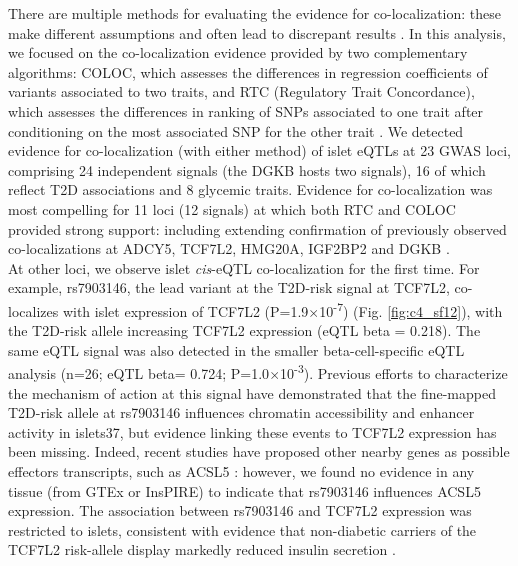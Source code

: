 There are multiple methods for evaluating the evidence for co-localization: these make different assumptions and often lead to discrepant results \cite{kanduriColocalizationAnalysesGenomic}. In this analysis, we focused on the co-localization evidence provided by two complementary algorithms: COLOC, which assesses the differences in regression coefficients of variants associated to two traits, and RTC (Regulatory Trait Concordance), which assesses the differences in ranking of SNPs associated to one trait after conditioning on the most associated SNP for the other trait \cite{giambartolomeiBayesianTestColocalisation2014, ongenEstimatingCausalTissues2017}. We detected evidence for co-localization (with either method) of islet eQTLs at 23 GWAS loci, comprising 24 independent signals (the DGKB hosts two signals), 16 of which reflect T2D associations and 8 glycemic traits. Evidence for co-localization was most compelling for 11 loci (12 signals) at which both RTC and COLOC provided strong support: including extending confirmation of previously observed co-localizations at ADCY5, TCF7L2, HMG20A, IGF2BP2 and DGKB \cite{thurnerIntegrationHumanPancreatic2018, carratDecreasedSTARD10Expression2017}. \\
    
At other loci, we observe islet \textit{cis}-eQTL co-localization for the first time. For example, rs7903146, the lead variant at the T2D-risk signal at TCF7L2, co-localizes with islet expression of TCF7L2 (P=1.9$\times$10\textsuperscript{-7}) (Fig. \ref{fig:c4_sf12}), with the T2D-risk allele increasing TCF7L2 expression (eQTL beta = 0.218). The same eQTL signal was also detected in the smaller beta-cell-specific eQTL analysis (n=26; eQTL beta= 0.724; P=1.0$\times$10\textsuperscript{-3}). Previous efforts to characterize the mechanism of action at this signal have demonstrated that the fine-mapped T2D-risk allele at rs7903146 influences chromatin accessibility and enhancer activity in islets37, but evidence linking these events to TCF7L2 expression has been missing. Indeed, recent studies have proposed other nearby genes as possible effectors transcripts, such as ACSL5 \cite{grantVariantTranscriptionFactor2006}: however, we found no evidence in any tissue (from GTEx or InsPIRE) to indicate that rs7903146 influences ACSL5 expression. The association between rs7903146 and TCF7L2 expression was restricted to islets, consistent with evidence that non-diabetic carriers of the TCF7L2 risk-allele display markedly reduced insulin secretion \cite{zhouTCF7L2MasterRegulator2014}. \\

